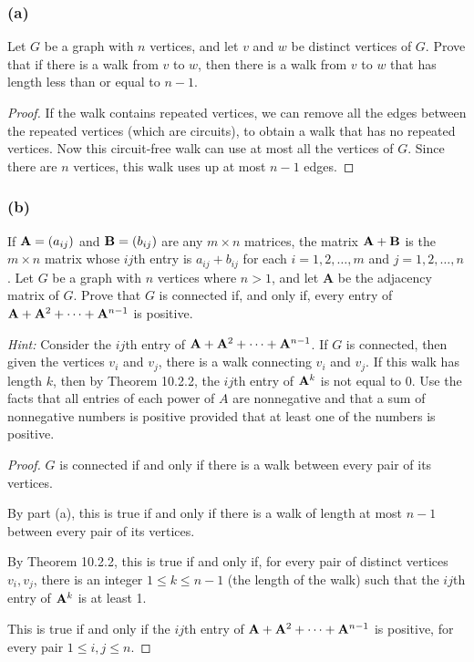 \documentclass[14pt]{extarticle}
\begin{document}
\subsubsection{(a)}
Let \(G\) be a graph with \(n\) vertices, and let \(v\) and \(w\) be distinct vertices of \(G\). Prove that if there is a 
walk from \(v\) to \(w\), then there is a walk from \(v\) to \(w\) that has length less than or equal to \(n - 1\).

\begin{proof}
If the walk contains repeated vertices, we can remove all the edges between the repeated vertices (which are circuits), to 
obtain a walk that has no repeated vertices. Now this circuit-free walk can use at most all the vertices of \(G\). Since 
there are \(n\) vertices, this walk uses up at most \(n-1\) edges.
\end{proof}

\subsubsection{(b)}
If \({\bf A} = (a_{ij})\) and \({\bf B} = (b_{ij})\) are any \(m \times n\) matrices, the matrix \({\bf A} + {\bf B}\) is 
the \(m \times n\) matrix whose \(ij\)th entry is \(a_{ij} + b_{ij}\) for each \(i = 1, 2, \ldots, m\) and \(j = 1, 2, 
\ldots, n\). Let \(G\) be a graph with \(n\) vertices where \(n > 1\), and let {\bf A} be the adjacency matrix of \(G\). 
Prove that \(G\) is connected if, and only if, every entry of \({\bf A} + {\bf A}^2 + \cdots + {\bf A}^{n-1}\) is positive.

{\it Hint:} Consider the \(ij\)th entry of \({\bf A} + {\bf A}^2 + \cdots + {\bf A}^{n-1}\). If \(G\) is connected, then 
given the vertices \(v_i\) and \(v_j\), there is a walk connecting \(v_i\) and \(v_j\). If this walk has length \(k\), 
then by Theorem 10.2.2, the \(ij\)th entry of \({\bf A}^k\) is not equal to 0. Use the facts that all entries of each power 
of \(A\) are nonnegative and that a sum of nonnegative numbers is positive provided that at least one of the numbers is 
positive.

\begin{proof}
\(G\) is connected if and only if there is a walk between every pair of its vertices.

By part (a), this is true if and only if there is a walk of length at most \(n-1\) between every pair of its vertices.

By Theorem 10.2.2, this is true if and only if, for every pair of distinct vertices \(v_i, v_j\), there is an integer 
\(1 \leq k \leq n-1\) (the length of the walk) such that the \(ij\)th entry of \({\bf A}^k\) is at least 1.

This is true if and only if the \(ij\)th entry of \({\bf A} + {\bf A}^2 + \cdots + {\bf A}^{n-1}\) is positive, for every
pair \(1 \leq i,j \leq n\).
\end{proof}
\end{document}
